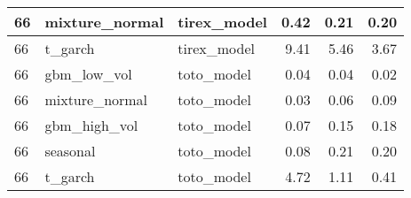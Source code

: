 {\begin{tabular}{lllrrr}
\midrule
66 & mixture\_normal & tirex\_model & 0.42 & 0.21 & 0.20 \\
\midrule
66 & t\_garch & tirex\_model & 9.41 & 5.46 & 3.67 \\
\midrule
66 & gbm\_low\_vol & toto\_model & 0.04 & 0.04 & 0.02 \\
\midrule
66 & mixture\_normal & toto\_model & 0.03 & 0.06 & 0.09 \\
\midrule
66 & gbm\_high\_vol & toto\_model & 0.07 & 0.15 & 0.18 \\
\midrule
66 & seasonal & toto\_model & 0.08 & 0.21 & 0.20 \\
\midrule
66 & t\_garch & toto\_model & 4.72 & 1.11 & 0.41 \\
\bottomrule
\end{tabular}
}